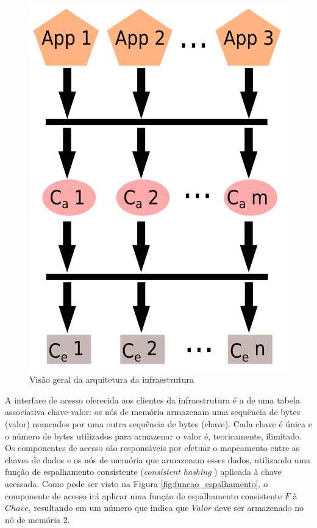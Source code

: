 \documentclass[11pt,twoside,a4paper]{book}
\begin{document}
\begin{figure}
  \centering
  \includegraphics[width=.90\textwidth]{overview_arquitetura} 
  \caption{Visão geral da arquitetura da infraestrutura}
  \label{fig:overview_arquitetura} 
\end{figure}

A interface de acesso oferecida aos clientes da infraestrutura é a de uma tabela associativa chave-valor: os nós de memória armazenam uma sequência de bytes (valor) nomeados por uma outra sequência de bytes (chave). Cada chave é única e o número de bytes utilizados para armazenar o valor é, teoricamente, ilimitado. Os componentes de acesso são responsáveis por efetuar o mapeamento entre as chaves de dados e os nós de memória que armazenam esses dados, utilizando uma função de espalhamento consistente (\emph{consistent hashing} \cite{consistent_hashing}) aplicada à chave acessada. Como pode ser visto na Figura \ref{fig:funcao_espalhamento}, o componente de acesso irá aplicar uma função de espalhamento consistente \textbf{$F$} à $Chave$, resultando em um número que indica que $Valor$ deve ser armazenado no nó de memória 2. 
\end{document}
